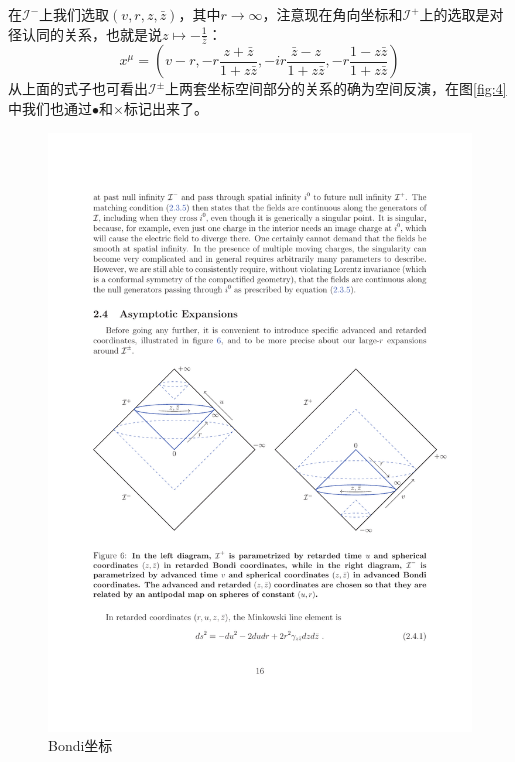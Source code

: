 在$\mathcal{I}^-$上我们选取$(v,r,z,\bar z)$，其中$r\to \infty$，注意现在角向坐标和$\mathcal{I}^+$上的选取是对径认同的关系，也就是说$z\mapsto-\frac{1}{\bar z}$：
\begin{equation}
	x^\mu=\left(v-r,-r\frac{z+\bar z}{1+z\bar z},-ir\frac{\bar z-z}{1+z\bar z},-r\frac{1-z\bar z}{1+z\bar z}\right)		
\end{equation}
从上面的式子也可看出$\mathcal{I}^\pm$上两套坐标空间部分的关系的确为空间反演，在图\ref{fig:4}中我们也通过{\color{red}$\bullet$}和{\color{red}$\times$}标记出来了。
\begin{figure}[htbp]
	\centering
	\includegraphics[width=\linewidth]{figs/fig1.pdf}
	\caption{Bondi坐标}
\end{figure}

